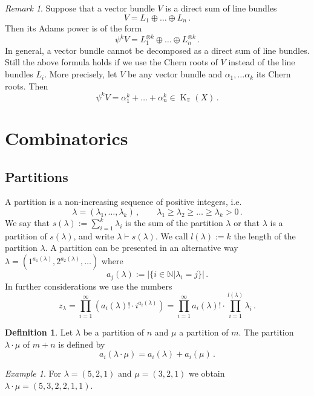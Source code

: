 \documentclass[12pt,a4paper]{amsart}
\theoremstyle{plain}
\theoremstyle{definition}
\newtheorem{df}[tw]{Definition}
\theoremstyle{remark}
\newtheorem{rem}[tw]{Remark}
\newtheorem{ex}[tw]{Example}
\newcommand{\NN}{\mathbb{N}}
\newcommand{\TT}{\mathbb{T}}
\DeclareMathOperator{\KTh}{K}
\begin{document}
\begin{rem} \label{rem:Adams}
	Suppose that a vector bundle $V$ is a direct sum of line bundles
	$$V=L_1\oplus\dots\oplus L_n\,.$$
	Then its Adams power is of the form
	$$\psi^kV=L^{\otimes k}_1\oplus\dots\oplus L^{\otimes k}_n\,.$$
	In general, a vector bundle cannot be decomposed as a direct sum of line bundles. Still the above formula holds if we use the Chern roots of $V$ instead of the line bundles $L_i$. More precisely, let $V$ be any vector bundle and $\alpha_1,\dots\alpha_k$ its Chern roots. Then
	$$\psi^kV=\alpha_1^{k}+\dots+\alpha^{k}_n \in \KTh_\TT(X)\,.$$
\end{rem}
\section{Combinatorics}
\subsection{Partitions}
A partition is a non-increasing sequence of positive integers, i.e.
$$
\lambda=(\lambda_1,\dots,\lambda_k)\,,\qquad \lambda_1\ge\lambda_2\ge\dots\ge\lambda_k >0\,.
$$
We say that $s(\lambda):=\sum_{i=1}^{k} \lambda_i$ is the sum of the partition $\lambda$ or that $\lambda$ is a partition of $s(\lambda)$, and write $\lambda\vdash s(\lambda)$. We call $l(\lambda):=k$ the length of the partition $\lambda$. A partition can be presented in an alternative way $\lambda=(1^{a_1(\lambda)},2^{a_2(\lambda)},\dots)$ where
$$a_j(\lambda):=|\{i\in \NN|\lambda_i=j\}|\,.$$
In further considerations we use the numbers
\begin{equation} \label{w:4}
	z_{\lambda}=\prod_{i=1}^\infty\left( a_i(\lambda)!\cdot i^{a_i(\lambda)}\right)=\prod_{i=1}^\infty a_i(\lambda)!\cdot \prod_{i=1}^{l(\lambda)}\lambda_i\,.
\end{equation}
\begin{df}
	Let $\lambda$ be a partition of $n$ and $\mu$ a partition of $m$.
	The partition $\lambda\cdot\mu$ of $m+n$ is defined by
	$$a_i(\lambda\cdot\mu)=a_i(\lambda)+a_i(\mu)\,. $$
\end{df}
\begin{ex}
	For $\lambda=(5,2,1)$ and $\mu=(3,2,1)$ we obtain 
	$\lambda\cdot\mu=(5,3,2,2,1,1)$.
\end{ex}
\end{document}
